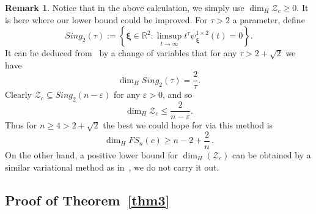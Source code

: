 \documentclass[10pt]{amsart}
\theoremstyle{definition}
\newtheorem{remark}{Remark}
\newcommand{\ux}{\boldsymbol{\xi}}
\newcommand{\R}{\mathbb{R}}
\begin{document}
\begin{remark}  \label{rrr}
Notice that in the above calculation, we simply use $\dim_H  \mathcal{Z}_{c}\geq 0$. It is here where our lower bound could be improved. 
For $\tau>2$ a parameter, define 
\begin{equation*}
    Sing_{2}(\tau):=\left\{ \ux \in \R^{2}: \limsup_{t\to \infty} t^{\tau}\psi_{\ux}^{1\times 2}(t)=0 \right\}.
\end{equation*}
It can be deduced from~\cite[Theorem 1.4-1.9]{DFSU_singular} by a change of variables
that for any $\tau>2+\sqrt{2}$ we have
\begin{equation*}
     \dim_H Sing_{2}(\tau)=\frac{2}{\tau}.
\end{equation*}
Clearly $\mathcal{Z}_{c} \subseteq Sing_{2}(n-\varepsilon)$ for any $\varepsilon>0$, and so
	\[
	\dim_H  \mathcal{Z}_{c} \leq \frac{2}{n-\varepsilon}.
	\]
 Thus for $n\ge 4>2+\sqrt{2}$ the best we could hope for via this method is
 \begin{equation*}
     \dim_H FS_{n}(c)\geq n-2 + \frac{2}{n}\, .
 \end{equation*}
  On the other hand, a positive lower bound for $\dim_H (\mathcal{Z}_{c})$ can be obtained by a similar variational method as in~\cite[Theorem~2.1]{j3},
 we do not carry it out.

\end{remark}


\subsection{Proof of Theorem~\ref{thm3}} \label{Sect6}
\end{document}
